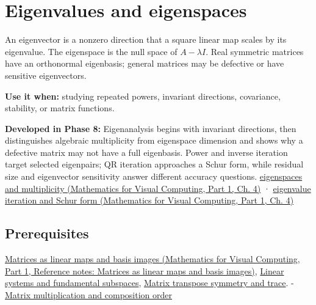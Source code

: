 \hypertarget{appendix-0b3be18411f9}{}\label{referencestart:appendix-0b3be18411f9}
\section{Eigenvalues and eigenspaces}\label{appendix-0b3be18411f9-eigenvalues-and-eigenspaces}

\hypertarget{appendix-0b3be18411f9-eigenvalues-and-eigenspaces}{}

An eigenvector is a nonzero direction that a square linear map scales by its eigenvalue. The eigenspace is the null space of \(A-\lambda I\). Real symmetric matrices have an orthonormal eigenbasis; general matrices may be defective or have sensitive eigenvectors.

\textbf{Use it when:} studying repeated powers, invariant directions, covariance, stability, or matrix functions.

\textbf{Developed in Phase 8:} Eigenanalysis begins with invariant directions, then distinguishes algebraic multiplicity from eigenspace dimension and shows why a defective matrix may not have a full eigenbasis. Power and inverse iteration target selected eigenpairs; QR iteration approaches a Schur form, while residual size and eigenvector sensitivity answer different accuracy questions. \href{../02-Mathematics-for-Visual-Computing-P01/main.pdf\#01-foundations-i-ch020-eigenvalues-eigenspaces-and-the-two-kinds-of-multiplicity}{eigenspaces and multiplicity (Mathematics for Visual Computing, Part 1, Ch. 4)} · \href{../02-Mathematics-for-Visual-Computing-P01/main.pdf\#01-foundations-i-ch020-qr-iteration-and-jacobi-rotations-preserve-the-spectrum-while-simplifying-shape}{eigenvalue iteration and Schur form (Mathematics for Visual Computing, Part 1, Ch. 4)}

\subsection{Prerequisites}\label{appendix-0b3be18411f9-prerequisites}

\hypertarget{appendix-0b3be18411f9-prerequisites}{}

\href{../02-Mathematics-for-Visual-Computing-P01/main.pdf\#appendix-bd39c3bf5d64}{Matrices as linear maps and basis images (Mathematics for Visual Computing, Part 1, Reference notes: Matrices as linear maps and basis images)}, \hyperref[appendix-8572a4a060c1]{Linear systems and fundamental subspaces}, \hyperref[appendix-175ca5ff874d]{Matrix transpose symmetry and trace}. - \hyperref[appendix-ab31ef447dbf]{Matrix multiplication and composition order}

